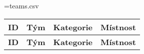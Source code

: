 \documentclass[\classoptions]{fksgeneric}
\begin{document}


\newwrite\csvfile
\immediate\openout\csvfile=teams.csv

\begin{longtable}{rlll}
\textbf{ID} & \textbf{Tým} & \textbf{Kategorie} & \textbf{Místnost}\\
\endfirsthead
\textbf{ID} & \textbf{Tým} & \textbf{Kategorie} & \textbf{Místnost}\\
\endhead

\end{longtable}

\immediate\closeout\csvfile
\end{document}
